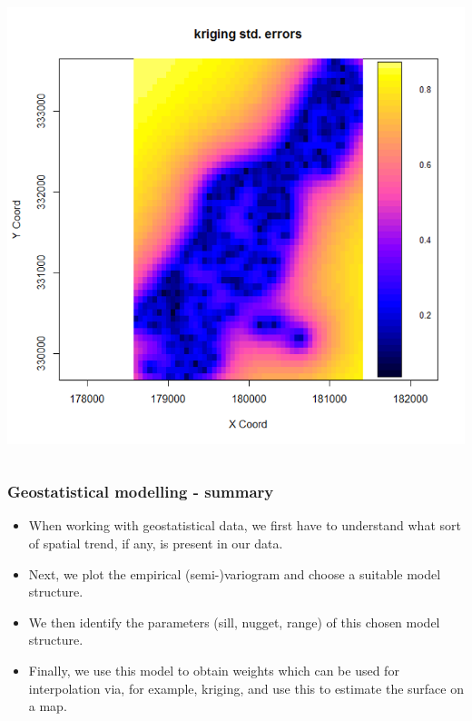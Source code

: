 \documentclass[parskip,12pt]{beamer}
\begin{document}
\begin{frame}
\begin{columns}
\begin{column}{0.5\textwidth}
\begin{center}
     \includegraphics[width=\textwidth]{MeuseErrors}
          \end{center}
\end{column}
\end{columns}
\end{frame}

\begin{frame}
\frametitle{Geostatistical modelling - summary}
 \begin{itemize}
\item When working with geostatistical data, we first have to understand what sort of spatial trend, if any, is present in our data. 
\vspace{3mm}
\item Next, we plot the empirical (semi-)variogram and choose a suitable model structure.
\vspace{3mm}
\item We then identify the parameters (sill, nugget, range) of this chosen model structure.
\vspace{3mm}
\item Finally, we use this model to obtain weights which can be used for interpolation via, for example, kriging, and use this to estimate the surface on a map.
\end{itemize}
\end{frame}
\end{document}
